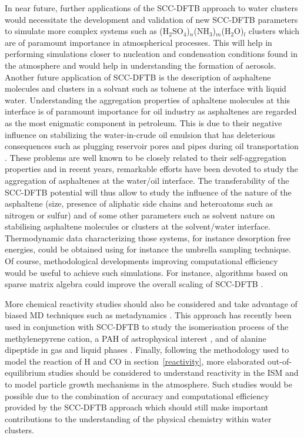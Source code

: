 \documentclass[]{interact}
\theoremstyle{plain}%
\theoremstyle{definition}
\theoremstyle{remark}
\begin{document}
In near future, further applications of the SCC-DFTB approach to water clusters would necessitate
the development and validation of new SCC-DFTB parameters to simulate more complex
systems such as (H$_{2}$SO$_{4}$)$_{n}$(NH$_{3}$)$_{m}$(H$_{2}$O)$_{l}$ clusters which are of
paramount importance in atmospherical processes. This will help in performing simulations closer
to nucleation and condensation conditions found in the  atmosphere and would help in understanding
the formation of aerosols.
Another future application of SCC-DFTB is the description of asphaltene molecules and clusters in a
solvant such as toluene at the interface with liquid water. Understanding the aggregation properties 
of aphaltene molecules at this interface is of paramount importance for oil industry as asphaltenes
are regarded as the most enigmatic component in petroleum. This is due to  their negative influence on
stabilizing the water-in-crude oil emulsion that has deleterious consequences such as plugging
reservoir pores and pipes during oil transportation \cite{asphaltene2015}. These problems are well known to be
closely related to their self-aggregation properties and in recent years, remarkable efforts have been devoted
to study the aggregation of asphaltenes at the water/oil interface. The transferability of the SCC-DFTB
potential will thus allow to study the influence of the nature of the asphaltene (size, presence of aliphatic side chains 
and heteroatoms such as nitrogen or sulfur) and of some other parameters such as solvent nature on 
stabilising asphaltene molecules or clusters at the solvent/water interface. Thermodynamic data
characterizing those systems, for instance desorption free energies, could be obtained using for
instance the umbrella sampling technique. Of course, methodological developments improving
computational efficiency would be useful to achieve such simulations. For instance, algorithms based
on sparse matrix algebra could improve the overall scaling of SCC-DFTB \cite{Scemama2014}.

More chemical reactivity studies should also be considered and  take advantage of biased MD
techniques such as metadynamics \cite{Laio2002,Iannuzzi2003,Laio2005}. This approach has recently
been used in conjunction with SCC-DFTB to study the isomerisation process of the methylenepyrene
cation, a PAH of astrophysical interest \cite{meta_isom}, and of alanine dipeptide in gas and liquid phases
\cite{Cuny2017c}. Finally, following the methodology used to model the reaction of H and CO in section~\ref{reactivity},
more elaborated out-of-equilibrium studies should be considered to understand reactivity in the ISM
and to model particle growth mechanisms in the atmosphere. Such studies would be possible due to
the combination of accuracy and computational efficiency provided by the SCC-DFTB approach which
should still make important contributions to  the understanding of the physical chemistry within water clusters.
\end{document}
